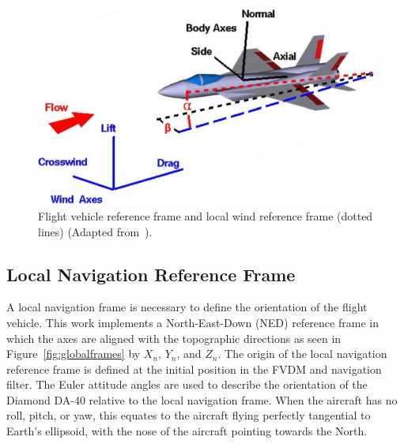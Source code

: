 \begin{figure}[!ht]
    \centering
    \includegraphics[width=0.75\linewidth]{Figures/windaxes.png}
    \caption{Flight vehicle reference frame and local wind reference frame (dotted lines) (Adapted from~\cite{ForceBalanceCoordinates1969}).}\label{fig:windframe}
\end{figure}

\subsection{\textbf{Local Navigation Reference Frame}}
A local navigation frame is necessary to define the orientation of the flight vehicle. This work implements a North-East-Down (NED) reference frame in which the axes are aligned with the topographic directions as seen in Figure~\ref{fig:globalframes} by \(X_n\), \(Y_n\), and \(Z_n\). The origin of the local navigation reference frame is defined at the initial position in the FVDM and navigation filter. The Euler attitude angles are used to describe the orientation of the Diamond DA-40 relative to the local navigation frame. When the aircraft has no roll, pitch, or yaw, this equates to the aircraft flying perfectly tangential to Earth's ellipsoid, with the nose of the aircraft pointing towards the North.

